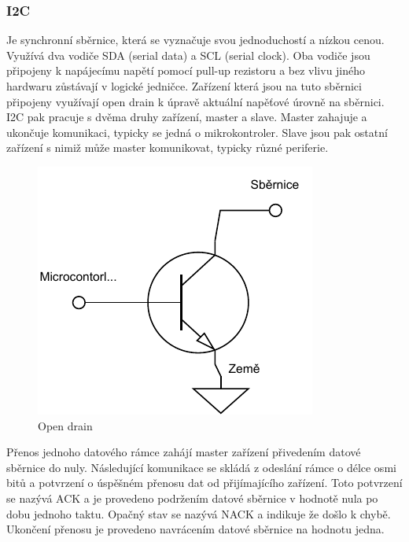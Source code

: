 \subsubsection{I2C}
Je synchronní sběrnice, která se vyznačuje svou jednoduchostí a nízkou cenou. Využívá dva vodiče SDA (serial data) a SCL (serial clock). Oba vodiče jsou připojeny k napájecímu napětí pomocí pull-up rezistoru a bez vlivu jiného hardwaru zůstávají v logické jedničce. Zařízení která jsou na tuto sběrnici připojeny využívají open drain k úpravě aktuální napěťové úrovně na sběrnici. I2C pak pracuje s dvěma druhy zařízení, master a slave. Master zahajuje a ukončuje komunikaci, typicky se jedná o mikrokontroler. Slave jsou pak ostatní zařízení s nimiž může master komunikovat, typicky různé periferie. \cite{um10204}

\begin{figure}[h!]
	\centering
	\includegraphics[scale=0.75]{obrazky-figures/open_drain.pdf}
	\caption{Open drain}
	\label{}
\end{figure}

Přenos jednoho datového rámce zahájí master zařízení přivedením datové sběrnice do nuly. Následující komunikace se skládá z odeslání rámce o délce osmi bitů a potvrzení o úspěšném přenosu dat od přijímajícího zařízení. Toto potvrzení se nazývá ACK a je provedeno podržením datové sběrnice v hodnotě nula po dobu jednoho taktu. Opačný stav se nazývá NACK a indikuje že došlo k chybě. Ukončení přenosu je provedeno navrácením datové sběrnice na hodnotu jedna.


